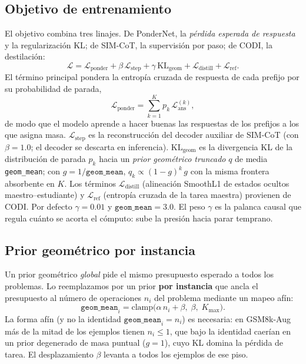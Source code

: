 \documentclass[11pt]{article}
\begin{document}
\subsection{Objetivo de entrenamiento}
\label{sec:loss}

El objetivo combina tres linajes. De PonderNet, la \emph{pérdida esperada de respuesta} y la regularización KL; de SIM-CoT, la supervisión por paso; de CODI, la destilación:
\begin{equation}
  \mathcal{L} = \mathcal{L}_{\text{ponder}}
  + \beta\,\mathcal{L}_{\text{step}}
  + \gamma\,\mathrm{KL}_{\text{geom}}
  + \mathcal{L}_{\text{distill}}
  + \mathcal{L}_{\text{ref}} .
  \label{eq:loss}
\end{equation}
El término principal pondera la entropía cruzada de respuesta de cada prefijo por su probabilidad de parada,
\begin{equation}
  \mathcal{L}_{\text{ponder}}
  = \sum_{k=1}^{K} p_k \, \mathcal{L}_{\text{ans}}^{(k)} ,
  \label{eq:lponder}
\end{equation}
de modo que el modelo aprende a hacer buenas las respuestas de los prefijos a los que asigna masa. $\mathcal{L}_{\text{step}}$ es la reconstrucción del decoder auxiliar de SIM-CoT (con $\beta=1.0$; el decoder se descarta en inferencia). $\mathrm{KL}_{\text{geom}}$ es la divergencia KL de la distribución de parada $p_k$ hacia un \emph{prior geométrico truncado} $q$ de media \texttt{geom\_mean}; con $g = 1/\texttt{geom\_mean}$, $q_k \propto (1-g)^{k}\,g$ con la misma frontera absorbente en $K$. Los términos $\mathcal{L}_{\text{distill}}$ (alineación SmoothL1 de estados ocultos maestro--estudiante) y $\mathcal{L}_{\text{ref}}$ (entropía cruzada de la tarea maestra) provienen de CODI. Por defecto $\gamma=0.01$ y $\texttt{geom\_mean}=3.0$. El peso $\gamma$ es la palanca causal que regula cuánto se acorta el cómputo: sube la presión hacia parar temprano.

\subsection{Prior geométrico por instancia}
\label{sec:prior}

Un prior geométrico \emph{global} pide el mismo presupuesto esperado a todos los problemas. Lo reemplazamos por un prior \textbf{por instancia} que ancla el presupuesto al número de operaciones $n_i$ del problema mediante un mapeo afín:
\begin{equation}
  \texttt{geom\_mean}_i = \mathrm{clamp}\big(\alpha\, n_i + \beta,\; \beta,\; K_{\max}\big).
  \label{eq:adaptiveprior}
\end{equation}
La forma afín (y no la identidad $\texttt{geom\_mean}_i = n_i$) es necesaria: en GSM8k-Aug más de la mitad de los ejemplos tienen $n_i \le 1$, que bajo la identidad caerían en un prior degenerado de masa puntual ($g=1$), cuyo KL domina la pérdida de tarea. El desplazamiento $\beta$ levanta a todos los ejemplos de ese piso.
\end{document}
